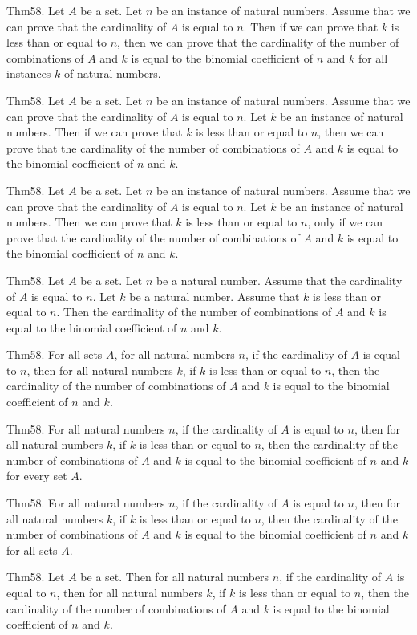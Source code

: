 \documentclass{article}
\begin{document}
Thm58. Let $A$ be a set. Let $n$ be an instance of natural numbers. Assume that we can prove that the cardinality of $A$ is equal to $n$. Then if we can prove that $k$ is less than or equal to $n$, then we can prove that the cardinality of the number of combinations of $A$ and $k$ is equal to the binomial coefficient of $n$ and $k$ for all instances $k$ of natural numbers.

Thm58. Let $A$ be a set. Let $n$ be an instance of natural numbers. Assume that we can prove that the cardinality of $A$ is equal to $n$. Let $k$ be an instance of natural numbers. Then if we can prove that $k$ is less than or equal to $n$, then we can prove that the cardinality of the number of combinations of $A$ and $k$ is equal to the binomial coefficient of $n$ and $k$.

Thm58. Let $A$ be a set. Let $n$ be an instance of natural numbers. Assume that we can prove that the cardinality of $A$ is equal to $n$. Let $k$ be an instance of natural numbers. Then we can prove that $k$ is less than or equal to $n$, only if we can prove that the cardinality of the number of combinations of $A$ and $k$ is equal to the binomial coefficient of $n$ and $k$.

Thm58. Let $A$ be a set. Let $n$ be a natural number. Assume that the cardinality of $A$ is equal to $n$. Let $k$ be a natural number. Assume that $k$ is less than or equal to $n$. Then the cardinality of the number of combinations of $A$ and $k$ is equal to the binomial coefficient of $n$ and $k$.

Thm58. For all sets $A$, for all natural numbers $n$, if the cardinality of $A$ is equal to $n$, then for all natural numbers $k$, if $k$ is less than or equal to $n$, then the cardinality of the number of combinations of $A$ and $k$ is equal to the binomial coefficient of $n$ and $k$.

Thm58. For all natural numbers $n$, if the cardinality of $A$ is equal to $n$, then for all natural numbers $k$, if $k$ is less than or equal to $n$, then the cardinality of the number of combinations of $A$ and $k$ is equal to the binomial coefficient of $n$ and $k$ for every set $A$.

Thm58. For all natural numbers $n$, if the cardinality of $A$ is equal to $n$, then for all natural numbers $k$, if $k$ is less than or equal to $n$, then the cardinality of the number of combinations of $A$ and $k$ is equal to the binomial coefficient of $n$ and $k$ for all sets $A$.

Thm58. Let $A$ be a set. Then for all natural numbers $n$, if the cardinality of $A$ is equal to $n$, then for all natural numbers $k$, if $k$ is less than or equal to $n$, then the cardinality of the number of combinations of $A$ and $k$ is equal to the binomial coefficient of $n$ and $k$.
\end{document}
